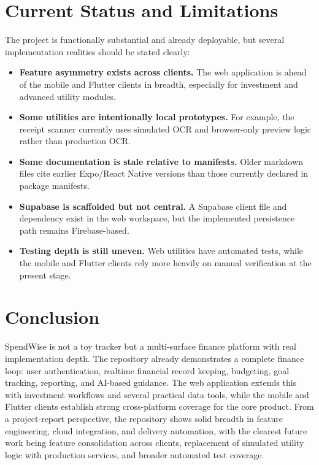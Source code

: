\documentclass[conference]{IEEEtran}
\begin{document}
\section{Current Status and Limitations}
The project is functionally substantial and already deployable, but several implementation realities should be stated clearly:
\begin{itemize}
\item \textbf{Feature asymmetry exists across clients.} The web application is ahead of the mobile and Flutter clients in breadth, especially for investment and advanced utility modules.
\item \textbf{Some utilities are intentionally local prototypes.} For example, the receipt scanner currently uses simulated OCR and browser-only preview logic rather than production OCR.
\item \textbf{Some documentation is stale relative to manifests.} Older markdown files cite earlier Expo/React Native versions than those currently declared in package manifests.
\item \textbf{Supabase is scaffolded but not central.} A Supabase client file and dependency exist in the web workspace, but the implemented persistence path remains Firebase-based.
\item \textbf{Testing depth is still uneven.} Web utilities have automated tests, while the mobile and Flutter clients rely more heavily on manual verification at the present stage.
\end{itemize}

\section{Conclusion}
SpendWise is not a toy tracker but a multi-surface finance platform with real implementation depth. The repository already demonstrates a complete finance loop: user authentication, realtime financial record keeping, budgeting, goal tracking, reporting, and AI-based guidance. The web application extends this with investment workflows and several practical data tools, while the mobile and Flutter clients establish strong cross-platform coverage for the core product. From a project-report perspective, the repository shows solid breadth in feature engineering, cloud integration, and delivery automation, with the clearest future work being feature consolidation across clients, replacement of simulated utility logic with production services, and broader automated test coverage.
\end{document}
